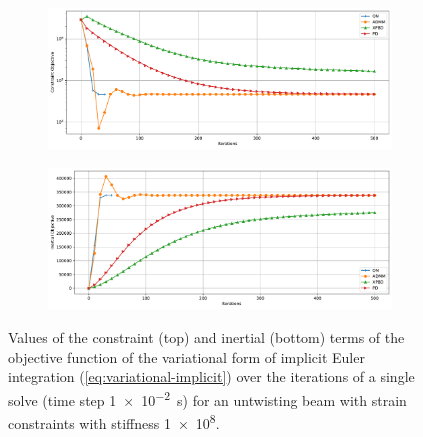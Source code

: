 \begin{figure}[h]
    \centering
    \begin{subfigure}{\textwidth}
        \includegraphics[width=\linewidth]{figures/strain_beam_untwist_constraintObjectives.pdf}
    \end{subfigure}
    \begin{subfigure}{\textwidth}
        \includegraphics[width=\linewidth]{figures/strain_beam_untwist_inertialObjectives.pdf}
    \end{subfigure}
    \caption{Values of the constraint (top) and inertial (bottom) terms of the objective function of the variational form of implicit Euler integration 
        (\cref{eq:variational-implicit}) over the iterations of a single solve (time step \SI{1e-2}{\second}) for an untwisting beam with strain 
    constraints with stiffness \num{1e8}.}
    \label{fig:strain-beam-untwist-objectives-split}
\end{figure}


